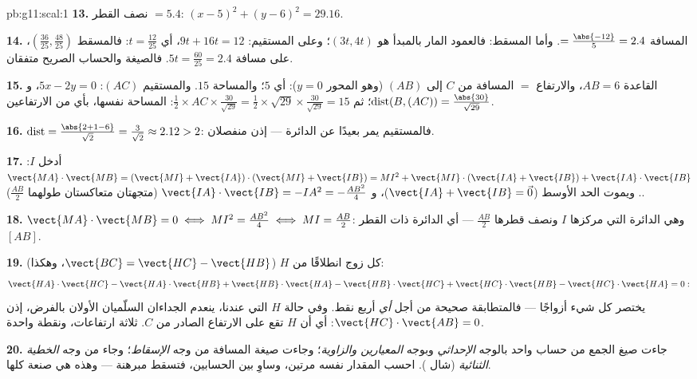 \begin{solution}{pb:g11:scal:1}
\textbf{13.} نصف القطر $= 5.4$:
$(x - 5)^2 + (y - 6)^2 = 29.16$.

\textbf{14.} المسافة $= \frac{\abs{-12}}{5} = 2.4$. وأما المسقط:
فالعمود المار بالمبدأ هو $(3t, 4t)$؛ وعلى المستقيم:
$9t + 16t = 12$، أي $t = \frac{12}{25}$: فالمسقط
$\left(\frac{36}{25}, \frac{48}{25}\right)$، على مسافة
$5t = \frac{60}{25} = 2.4$. فالصيغة والحساب الصريح
متفقان.

\textbf{15.} القاعدة $AB = 6$، والارتفاع $=$ المسافة من $C$ إلى
$(AB)$ (وهو المحور $y = 0$): أي $5$؛ والمساحة $15$. والمستقيم $(AC)$:
$5x - 2y = 0$، و
$\operatorname{dist}(B, (AC)) = \frac{\abs{30}}{\sqrt{29}}$؛
ثم $\frac12 \times AC \times \frac{30}{\sqrt{29}} =
\frac12 \times \sqrt{29} \times \frac{30}{\sqrt{29}} = 15$:
المساحة نفسها، بأي من الارتفاعين.

\textbf{16.} $\operatorname{dist} = \frac{\abs{2 + 1 - 6}}
{\sqrt2} = \frac{3}{\sqrt2} \approx 2.12 > 2$: فالمستقيم يمر
بعيدًا عن الدائرة --- إذن منفصلان.

\textbf{17.} أدخل $I$:
$\vect{MA} \cdot \vect{MB} = (\vect{MI} + \vect{IA}) \cdot
(\vect{MI} + \vect{IB}) = MI^2 + \vect{MI} \cdot (\vect{IA} +
\vect{IB}) + \vect{IA} \cdot \vect{IB}$. ويموت الحد الأوسط
($\vect{IA} + \vect{IB} = \vec 0$)، و
$\vect{IA} \cdot \vect{IB} = -IA^2 = -\frac{AB^2}{4}$
(متجهتان متعاكستان طولهما $\frac{AB}2$).

\textbf{18.} $\vect{MA} \cdot \vect{MB} = 0 \iff MI^2 =
\frac{AB^2}{4} \iff MI = \frac{AB}{2}$: وهي الدائرة التي مركزها
$I$ ونصف قطرها $\frac{AB}2$ --- أي الدائرة ذات القطر
$[AB]$.

\textbf{19.}  كل زوج انطلاقًا من $H$ ($\vect{BC} =
\vect{HC} - \vect{HB}$، وهكذا):
\[
\vect{HA} \cdot \vect{HC} - \vect{HA} \cdot \vect{HB}
+ \vect{HB} \cdot \vect{HA} - \vect{HB} \cdot \vect{HC}
+ \vect{HC} \cdot \vect{HB} - \vect{HC} \cdot \vect{HA} = 0 :
\]
يختصر كل شيء أزواجًا --- فالمتطابقة صحيحة من أجل
\emph{أي} أربع نقط. وفي حالة $H$ التي عندنا، ينعدم الجداءان
السلّميان الأولان بالفرض، إذن
$\vect{HC} \cdot \vect{AB} = 0$: أي أن $H$ تقع على الارتفاع الصادر من
$C$. ثلاثة ارتفاعات، ونقطة واحدة.

\textbf{20.} جاءت صيغ الجمع من حساب  واحد
بالوجه \emph{الإحداثي} وبوجه
\emph{المعيارين والزاوية}؛ وجاءت صيغة المسافة من
وجه \emph{الإسقاط}؛ وجاء  من
وجه \emph{الخطية الثنائية} (شال ). احسب المقدار
نفسه مرتين، وساوِ بين الحسابين، فتسقط مبرهنة --- وهذه هي صنعة  كلها.
\end{solution}
